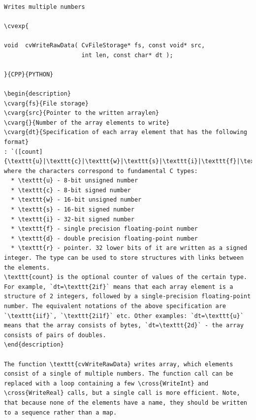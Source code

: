 \label{WriteRawData}
\begin{verbatim}

Writes multiple numbers

\cvexp{

void  cvWriteRawData( CvFileStorage* fs, const void* src,
                      int len, const char* dt );

}{CPP}{PYTHON}

\begin{description}
\cvarg{fs}{File storage}
\cvarg{src}{Pointer to the written arraylen}
\cvarg{}{Number of the array elements to write}
\cvarg{dt}{Specification of each array element that has the following format}
: `([count]{\texttt{u}|\texttt{c}|\texttt{w}|\texttt{s}|\texttt{i}|\texttt{f}|\texttt{d}})...`, where the characters correspond to fundamental C types:
  * \texttt{u} - 8-bit unsigned number
  * \texttt{c} - 8-bit signed number
  * \texttt{w} - 16-bit unsigned number
  * \texttt{s} - 16-bit signed number
  * \texttt{i} - 32-bit signed number
  * \texttt{f} - single precision floating-point number
  * \texttt{d} - double precision floating-point number
  * \texttt{r} - pointer. 32 lower bits of it are written as a signed integer. The type can be used to store structures with links between the elements.
\texttt{count} is the optional counter of values of the certain type. For example, `dt=\texttt{2if}` means that each array element is a structure of 2 integers, followed by a single-precision floating-point number. The equivalent notations of the above specification are `\texttt{iif}`, `\texttt{2i1f}` etc. Other examples: `dt=\texttt{u}` means that the array consists of bytes, `dt=\texttt{2d}` - the array consists of pairs of doubles.
\end{description}

The function \texttt{cvWriteRawData} writes array, which elements consist of a single of multiple numbers. The function call can be replaced with a loop containing a few \cross{WriteInt} and \cross{WriteReal} calls, but a single call is more efficient. Note, that because none of the elements have a name, they should be written to a sequence rather than a map.


\end{verbatim}
\label{WriteFileNode}
